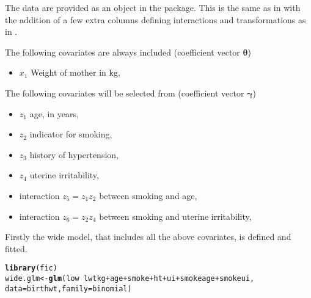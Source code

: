 \documentclass[article,shortnames,nojss,nofooter]{jss}\usepackage[]{graphicx}\usepackage[]{color}
\makeatletter
\newcommand{\hlopt}[1]{\textcolor[rgb]{0,0,0}{#1}}%
\newcommand{\hlstd}[1]{\textcolor[rgb]{0.345,0.345,0.345}{#1}}%
\newcommand{\hlkwb}[1]{\textcolor[rgb]{0.69,0.353,0.396}{#1}}%
\newcommand{\hlkwc}[1]{\textcolor[rgb]{0.333,0.667,0.333}{#1}}%
\newcommand{\hlkwd}[1]{\textcolor[rgb]{0.737,0.353,0.396}{\textbf{#1}}}%
\newenvironment{kframe}{%
 \def\at@end@of@kframe{}%
 \ifinner\ifhmode%
  \def\at@end@of@kframe{\end{minipage}}%
  \begin{minipage}{\columnwidth}%
 \fi\fi%
 \def\FrameCommand##1{\hskip\@totalleftmargin \hskip-\fboxsep
 \colorbox{shadecolor}{##1}\hskip-\fboxsep
     \hskip-\linewidth \hskip-\@totalleftmargin \hskip\columnwidth}%
 \MakeFramed {\advance\hsize-\width
   \@totalleftmargin\z@ \linewidth\hsize
   \@setminipage}}%
 {\par\unskip\endMakeFramed%
 \at@end@of@kframe}
\newenvironment{knitrout}{}{} %
\newcommand{\btheta}{\boldsymbol{\theta}}
\newcommand{\bgamma}{\boldsymbol{\gamma}}
\makeatother
\begin{document}
The data are provided as an object  in the  package.  This is the same as  in  \citep{venables:ripley} with the addition of a few extra columns defining interactions and transformations as in \citet{claeskens:hjort:book}. 

The following covariates are always included (coefficient vector $\btheta$)

\begin{itemize}
\item  $x_1$ Weight of mother in kg, 
\end{itemize}


The following covariates will be selected from (coefficient vector $\bgamma$)

\begin{itemize}

\item $z_1$ age, in years, 

\item $z_2$ indicator for smoking, 

\item $z_3$ history of hypertension, 

\item $z_4$ uterine irritability, 

\item interaction $z_5 = z_1 z_2$ between smoking and age, 

\item interaction $z_6 = z_2 z_4$ between smoking and uterine irritability, 
\end{itemize}

Firstly the wide model, that includes all the above covariates, is defined and fitted.  

\begin{knitrout}
\color{fgcolor}\begin{kframe}
\begin{alltt}
\hlkwd{library}\hlstd{(fic)}
\hlstd{wide.glm} \hlkwb{<-} \hlkwd{glm}\hlstd{(low} \hlopt{~} \hlstd{lwtkg} \hlopt{+} \hlstd{age} \hlopt{+} \hlstd{smoke} \hlopt{+} \hlstd{ht} \hlopt{+} \hlstd{ui} \hlopt{+} \hlstd{smokeage} \hlopt{+} \hlstd{smokeui,}
                \hlkwc{data}\hlstd{=birthwt,} \hlkwc{family}\hlstd{=binomial)}
\end{alltt}
\end{kframe}
\end{knitrout}
\end{document}
